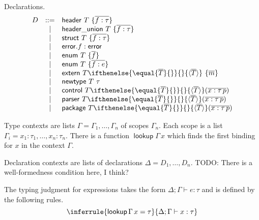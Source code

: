 \documentclass[10pt]{article}
\newcommand{\Sequent}[2]{\ensuremath{#1 \vdash #2}}
\newcommand{\Keyword}[1]{\ensuremath{\mathsf{#1}}}
\newcommand{\SynClassAndCase}[2]{#1 &\mathbin{::=} & #2 \\}
\newcommand{\SynCase}[1]{& \mathbin{|} & #1 \\}
\newenvironment{Syntax}
  {
      $$
      \begin{array}{lcl}
  }
  {
      \end{array}
      $$
  }
\newcommand{\Error}{\Keyword{error}}
\newcommand{\Many}[1]{\overline{#1}}
\newcommand{\AppWithTypes}[3]{
    #1
    \ifthenelse{\equal{#2}{}}
        {}
        {\langle #2 \rangle}
    (#3)
}
\newcommand{\Header}[2]{\Keyword{header}\ #1\ \{ #2 \}}
\newcommand{\HeaderUnion}[2]{\Keyword{header\_union}\ #1\ \{ #2 \}}
\newcommand{\Struct}[2]{\Keyword{struct}\ #1\ \{ #2 \}}
\newcommand{\ErrorDecl}[1]{\Error.f : \Error}
\newcommand{\Enum}[2]{\Keyword{enum}\ #1\ \{ #2 \}}
\newcommand{\SEnum}[2]{\Keyword{enum}\ #1\ \{ #2 \}}
\newcommand{\Extern}[3]{
    \Keyword{extern}\ #1
    \ifthenelse{\equal{#2}{}}
        {}
        {\langle #2 \rangle}\ \{ #3 \}
}
\newcommand{\Newtype}[2]{\Keyword{newtype}\ #1\ #2}
\newcommand{\Control}[3]{\Keyword{control}\ \AppWithTypes{#1}{#2}{#3}}
\newcommand{\Package}[3]{\Keyword{package}\ \AppWithTypes{#1}{#2}{#3}}
\newcommand{\Parser}[3]{\Keyword{parser}\ \AppWithTypes{#1}{#2}{#3}}
\newcommand{\Typed}[3]{\Sequent{#1;#2}{#3}}
\newcommand{\Lookup}[2]{\operatorname{\Keyword{lookup}} #1\,#2}
\begin{document}
Declarations.
\begin{Syntax}
    \SynClassAndCase{D}{\Header{T}{\Many{f: \tau}}}
    \SynCase{\HeaderUnion{T}{\Many{f: \tau}}}
    \SynCase{\Struct{T}{\Many{f: \tau}}}
    \SynCase{\ErrorDecl{T}}
    \SynCase{\Enum{T}{\Many{f}}}
    \SynCase{\SEnum{T}{\Many{f: e}}}
    \SynCase{\Extern{T}{\Many{T}}{\Many{m}}}
    \SynCase{\Newtype{T}{\tau}}
    \SynCase{\Control{T}{\Many{T}}{\Many{x : \tau\,p}}}
    \SynCase{\Parser{T}{\Many{T}}{\Many{x : \tau\,p}}}
    \SynCase{\Package{T}{\Many{T}}{\Many{x : \tau\,p}}}
\end{Syntax}

Type contexts are lists \(\Gamma = \Gamma_1, \dots, \Gamma_n\) of scopes
\(\Gamma_n\). Each scope is a list \(\Gamma_i = x_1 : \tau_1, \dots, x_n
: \tau_n\). There is a function \(\Lookup{\Gamma}{x}\) which finds the first
binding for \(x\) in the context \(\Gamma\).

Declaration contexts are lists of declarations \(\Delta = D_1, \dots, D_n\).
TODO: There is a well-formedness condition here, I think?

The typing judgment for expressions takes the form \(\Typed{\Delta}{\Gamma}{e
: \tau}\) and is defined by the following rules.
\[
    \inferrule{\Lookup{\Gamma}{x} = \tau}{\Typed{\Delta}{\Gamma}{x : \tau}}
\]
\end{document}
